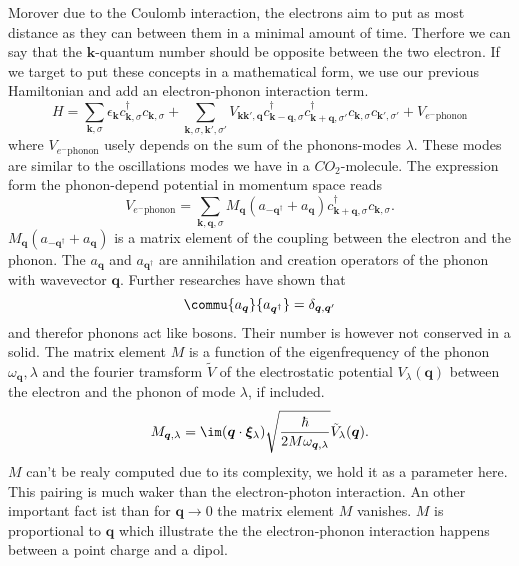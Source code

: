 \documentclass[../main.tex]{subfile}
\begin{document}
Morover due to the Coulomb interaction, the electrons aim to put as most distance as they can between them in a minimal amount of time. Therfore
we can say that the $\bm{k}$-quantum number should be opposite between the two electron. If we target to put these concepts in a mathematical form, we use
our previous Hamiltonian and add an electron-phonon interaction term.
\[
    H = \sum_{\bm{k},\sigma} \epsilon_{\bm{k}} c_{\bm{k},\sigma}^{\dagger}c_{\bm{k},\sigma} + \sum_{\bm{k},\sigma,\bm{k}',\sigma'}
        V_{\bm{k}\bm{k}', \bm{q}} c_{\bm{k}-\bm{q},\sigma}^{\dagger}c_{\bm{k}+\bm{q},\sigma'}^{\dagger}c_{\bm{k},\sigma}c_{\bm{k}',\sigma'} + V_{e^-\text{phonon}}
\]
where $V_{e^-\text{phonon}}$ usely depends on the sum of the phonons-modes $\lambda$. These modes are similar to the oscillations modes we have in a $CO_2$-molecule.
The expression form the phonon-depend potential in momentum space reads 
\begin{equation} \label{eq:Pot_phonon_interaction}
    V_{e^-\text{phonon}} = \sum_{\bm{k},\bm{q},\sigma} M_{\bm{q}}\left(a_{-\bm{q}^{\dagger}} + a_{\bm{q}}\right) c_{\bm{k}+\bm{q},\sigma}^{\dagger}c_{\bm{k},\sigma}.
\end{equation}
$M_{\bm{q}}\left(a_{-\bm{q}^{\dagger}} + a_{\bm{q}}\right) $ is a matrix element of the coupling between the electron and the phonon. 
The $a_{\bm{q}}$ and $a_{\bm{q}^{\dagger}}$ are annihilation and creation operators of the phonon with wavevector $\bm{q}$. Further researches have shown that 
\[
    \commu{a_{\bm{q}}}{a_{\bm{q}^{\dagger}}} = \delta_{\bm{q},\bm{q}'}
\] 
and therefor phonons act like bosons. Their number is however not conserved in a solid. The matrix element $M$ is a function of the eigenfrequency 
 of the phonon $\omega_{\bm{q}},\lambda$ and the fourier tramsform $\tilde{V}$ of the electrostatic potential $V_{\lambda}(\bm{q})$ between the electron
and the phonon of mode $\lambda$, if included.   
\[
    M_{\bm{q},\lambda} = \im (\bm{q}\cdot \bm{\xi}_{\lambda}) \sqrt{\frac{\hbar}{2M\omega_{\bm{q},\lambda}}} \tilde{V}_{\lambda}(\bm{q}).
\]
$M$ can't be realy computed due to its complexity, we hold it as a parameter here. This pairing is much waker than the electron-photon interaction. 
An other important fact ist than for $\bm{q}\rightarrow 0$ the matrix element $M$ vanishes. $M$ is proportional to $\bm{q}$ which illustrate the the electron-phonon interaction
happens between a point charge and a dipol.\\
\end{document}
